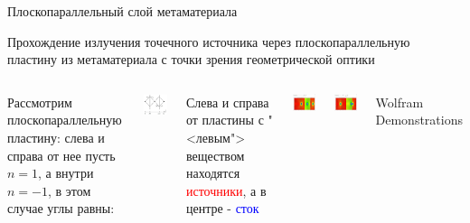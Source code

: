 \documentclass[9pt, compress, xcolor=table]{beamer}
\begin{document}
\begin{frame}{Плоскопараллельный слой метаматериала}

Прохождение излучения точечного источника через плоскопараллельную пластину из метаматериала с точки зрения геометрической оптики 
{\scriptsize
\begin{columns}[c]
\column{6cm} Рассмотрим плоскопараллельную пластину: слева и справа от нее пусть $n=1$, а внутри
$n=-1$, в этом случае углы равны:
\begin{center}
\includegraphics[width=4cm]{neg_ref_3}
\end{center}

Слева и справа от пластины с "<левым"> веществом находятся \textcolor{red}{источники}, а в центре -
\textcolor{blue}{сток}



\column{6cm}

\begin{center}
\includegraphics[width=3.8cm]{neg_ref_4}
\end{center}
\begin{center}
\includegraphics[width=3.8cm]{neg_ref_5}
\end{center}
Wolfram Demonstrations
\end{columns}
}
\end{frame}
\end{document}
